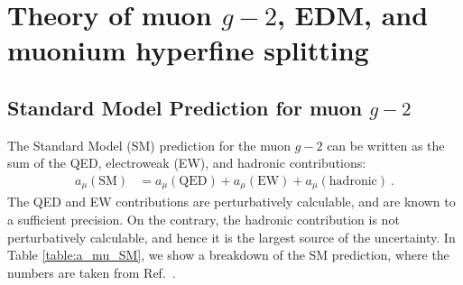 \section{Theory of muon $g-2$, EDM, and muonium hyperfine splitting}

\def\hpz{\hphantom{0}} \def\hpzz{\hphantom{00}} \def\hph{\hphantom{-}}

\subsection{Standard Model Prediction for muon $g-2$}

The Standard Model (SM) prediction for the muon $g-2$
can be written as the sum of the QED, electroweak (EW), and
hadronic contributions:
%
\begin{align}
   a_\mu(\text{SM})
&=   a_\mu(\text{QED}) +  a_\mu(\text{EW})
   + a_\mu(\text{hadronic})~.
\end{align}
%
The QED and EW contributions are perturbatively calculable,
and are known to a sufficient precision.  On the contrary,
the hadronic contribution is not perturbatively calculable,
and hence it is the largest source of the uncertainty.
In Table \ref{table:a_mu_SM}, we show a breakdown of the
SM prediction, where the numbers are taken from Ref.~\cite{KNT18}.


